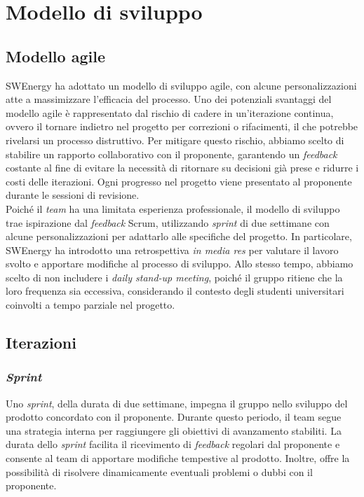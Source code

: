 \section{Modello di sviluppo}

\subsection{Modello agile}
SWEnergy ha adottato un modello di sviluppo agile, con alcune personalizzazioni atte 
a massimizzare l'efficacia del processo. 
Uno dei potenziali svantaggi del modello agile è rappresentato dal rischio di cadere 
in un'iterazione continua, ovvero il tornare indietro nel progetto per correzioni o 
rifacimenti, il che potrebbe rivelarsi un processo distruttivo. 
Per mitigare questo rischio, abbiamo scelto di stabilire un rapporto collaborativo 
con il proponente, garantendo un \textit{feedback} costante al fine di evitare la 
necessità di ritornare su decisioni già prese e ridurre i costi delle iterazioni. 
Ogni progresso nel progetto viene presentato al proponente durante le sessioni di revisione. \\

Poiché il \textit{team} ha una limitata esperienza professionale, il modello di sviluppo 
trae ispirazione dal \textit{feedback} Scrum, utilizzando \textit{sprint} di due settimane 
con alcune personalizzazioni per adattarlo alle specifiche del progetto. 
In particolare, SWEnergy ha introdotto una retrospettiva \textit{in media res} per valutare 
il lavoro svolto e apportare modifiche al processo di sviluppo. 
Allo stesso tempo, abbiamo scelto di non includere i \textit{daily stand-up meeting}, poiché 
il gruppo ritiene che la loro frequenza sia eccessiva, considerando il contesto degli 
studenti universitari coinvolti a tempo parziale nel progetto.

\subsection{Iterazioni}

\subsubsection{\textit{Sprint}}
Uno \textit{sprint}, della durata di due settimane, impegna il gruppo nello 
sviluppo del prodotto concordato con il proponente. 
Durante questo periodo, il team segue una strategia interna per raggiungere 
gli obiettivi di avanzamento stabiliti. 
La durata dello \textit{sprint} facilita il ricevimento di \textit{feedback} 
regolari dal proponente e consente al team di apportare modifiche tempestive 
al prodotto. 
Inoltre, offre la possibilità di risolvere dinamicamente eventuali problemi 
o dubbi con il proponente.

